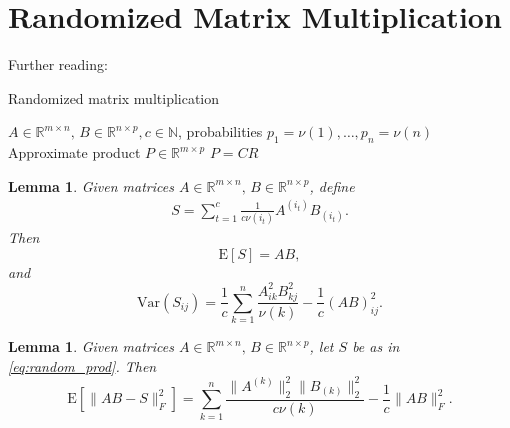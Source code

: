 \documentclass[13pt]{article}
\newtheorem{lem}[thm]{Lemma}
\newcommand{\R}{\mathbb{R}}
\newcommand{\N}{\mathbb{N}}
\newcommand{\V}{\mathrm{Var}}
\newcommand{\E}{\bm{\mathrm{E}}}
\begin{document}
\tableofcontents

\newpage

\setcounter{section}{1} %

\section{Randomized Matrix Multiplication}

Further reading: \cite{ln_random_linear16}

\begin{algorithm}
\caption{Randomized matrix multiplication}\label{alg:random_mult}
\begin{algorithmic}
    \Require $A \in \R^{m \times n},\, B \in \R^{n \times p}, c \in \N$, probabilities $p_1 = \nu(1), \ldots, p_n = \nu(n)$
    \Ensure Approximate product $P \in \R^{m \times p}$
    \EndFor
    \State \Return $P = CR$ 
\end{algorithmic}
\end{algorithm}

\begin{lem}
    Given matrices $A \in \R^{m \times n},\, B \in \R^{n \times p}$, define
    \begin{align}\label{eq:random_prod}
        S = \sum_{t=1}^c \frac{1}{c\nu(i_t)} A^{(i_t)} B_{(i_t)}. \tag{$\ast$}
    \end{align}
    Then
    \[
        \E[S] = AB,
    \]
    and
    \[
        \V(S_{ij}) = \frac{1}{c} \sum_{k = 1}^n \frac{A_{ik}^2B_{kj}^2}{\nu(k)} - \frac{1}{c}(AB)^2_{ij}.
    \]
\end{lem}

\begin{lem}
    Given matrices $A \in \R^{m \times n},\, B \in \R^{n \times p}$, let $S$ be
    as in \eqref{eq:random_prod}.
    Then
    \[
        \E\left[\|AB - S\|_F^2\right] = \sum_{k=1}^n \frac{\|A^{(k)}\|_2^2\|B_{(k)}\|_2^2}{c\nu(k)} - \frac{1}{c} \|AB\|_F^2.
    \]
\end{lem}

\newpage

\printbibliography
\end{document}
